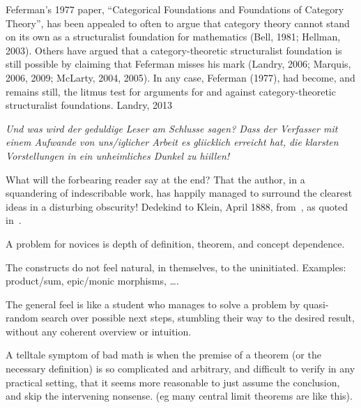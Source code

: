 \documentclass[11pt,openany]{book}
\begin{document}
\begin{boxquote}
Feferman’s 1977 paper, ``Categorical Foundations and Foundations
of Category Theory'', has been appealed to often to argue 
that category theory cannot stand
on its own as a structuralist foundation for mathematics
(Bell, 1981; Hellman, 2003).
Others have argued that a category-theoretic structuralist 
foundation is still possible by
claiming that Feferman misses his mark 
(Landry, 2006; Marquis, 2006, 2009; McLarty,
2004, 2005). 
In any case, Feferman (1977), had become, and remains still, 
the litmus test for arguments for and against category-theoretic
 structuralist foundations.
\tcblower
{Landry, 2013~\cite{Landry:2013:FefermanResponse}}
\end{boxquote}

\label{sec:Complexity}

\begin{boxquote}
\textsl{Und was wird der geduldige Leser am
Schlusse sagen? Dass der Verfasser mit einem Aufwande von uns/iglicher Arbeit es gliicklich
erreicht hat, die klarsten Vorstellungen in ein unheimliches Dunkel zu hiillen!}
\par
What will the forbearing reader say at the end? That the author,
 in a squandering of indescribable work, 
 has happily managed to surround 
the clearest ideas in a disturbing obscurity!
\tcblower
{Dedekind to Klein, April 1888, 
from~\cite{Dugac:1976:DedekindFondements},
as quoted in~\cite{Ferreiros:2007:Labyrinth}.}
\end{boxquote}

A problem for novices is depth of definition, theorem,
and concept dependence.


The constructs do not feel natural, in themselves, 
to the uninitiated.
Examples: product/sum, epic/monic morphisms, {\ldots}.

The general feel is like a student who manages to solve a problem
by quasi-random search over possible next steps,
stumbling their way to the desired result,
without any coherent overview or intuition.

A telltale symptom of bad math is when the premise of a theorem
(or the necessary definition) is so complicated and arbitrary,
and difficult to verify in any practical setting,
that it seems more reasonable to just assume the conclusion,
and skip the intervening nonsense.
(eg many central limit theorems are like this).
\end{document}
